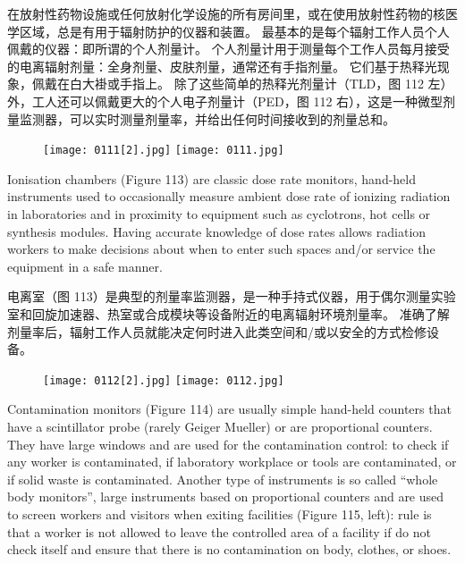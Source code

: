 \documentclass[dvipsnames, svgnames,a4paper,11pt]{article}
\begin{document}
在放射性药物设施或任何放射化学设施的所有房间里，或在使用放射性药物的核医学区域，总是有用于辐射防护的仪器和装置。 最基本的是每个辐射工作人员个人佩戴的仪器：即所谓的个人剂量计。 个人剂量计用于测量每个工作人员每月接受的电离辐射剂量：全身剂量、皮肤剂量，通常还有手指剂量。 它们基于热释光现象，佩戴在白大褂或手指上。 除了这些简单的热释光剂量计（TLD，图 112 左）外，工人还可以佩戴更大的个人电子剂量计（PED，图 112 右），这是一种微型剂量监测器，可以实时测量剂量率，并给出任何时间接收到的剂量总和。

\begin{figure}[htbp]
	\centering
    \texttt{[image: 0111[2].jpg]}    
    \hspace{0.1in}
    \texttt{[image: 0111.jpg]} 
     \label{fig112}
\end{figure}

Ionisation chambers (Figure 113) are classic dose rate monitors, hand-held
instruments used to occasionally measure ambient dose rate of ionizing radiation in
laboratories and in proximity to equipment such as cyclotrons, hot cells or synthesis
modules. Having accurate knowledge of dose rates allows radiation workers to make
decisions about when to enter such spaces and/or service the equipment in a safe
manner.

电离室（图 113）是典型的剂量率监测器，是一种手持式仪器，用于偶尔测量实验室和回旋加速器、热室或合成模块等设备附近的电离辐射环境剂量率。 准确了解剂量率后，辐射工作人员就能决定何时进入此类空间和/或以安全的方式检修设备。

\begin{figure}[htbp]
	\centering
    \texttt{[image: 0112[2].jpg]}    
    \hspace{0.1in}
    \texttt{[image: 0112.jpg]} 
     \label{fig113}
\end{figure}

Contamination monitors (Figure 114) are usually simple hand-held counters that
have a scintillator probe (rarely Geiger Mueller) or are proportional counters. They
have large windows and are used for the contamination control: to check if any
worker is contaminated, if laboratory workplace or tools are contaminated, or if solid
waste is contaminated. Another type of instruments is so called “whole body  monitors”, large instruments based on proportional counters and are used to screen
workers and visitors when exiting facilities (Figure 115, left): rule is that a worker is
not allowed to leave the controlled area of a facility if do not check itself and ensure
that there is no contamination on body, clothes, or shoes.
\end{document}
